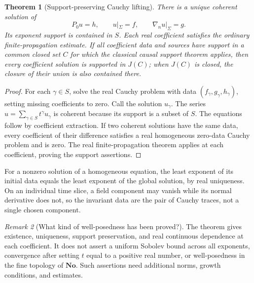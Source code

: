\documentclass[11pt,letterpaper]{article}
\newtheorem{theorem}{Theorem}[section]
\theoremstyle{definition}
\theoremstyle{remark}
\newtheorem{remark}[theorem]{Remark}
\newcommand{\No}{\mathbf{No}}
\begin{document}
\begin{theorem}[Support-preserving Cauchy lifting]\label{vtf:mink:thm:Cauchy}
There is a unique coherent solution of
\begin{equation}\label{vtf:mink:eq:Cauchy}
 P_0u=h,\qquad u|_\Sigma=f,\qquad
 \nabla_nu|_\Sigma=g.
\end{equation}
Its exponent support is contained in $S$. Each real coefficient satisfies the ordinary finite-propagation estimate. If all coefficient data and sources have support in a common closed set $C$ for which the classical causal support theorem applies, then every coefficient solution is supported in $J(C)$; when $J(C)$ is closed, the closure of their union is also contained there.
\end{theorem}
\begin{proof}
For each $\gamma\in S$, solve the real Cauchy problem with data $(f_\gamma,g_\gamma,h_\gamma)$, setting missing coefficients to zero. Call the solution $u_\gamma$. The series $u=\sum_{\gamma\in S}t^\gamma u_\gamma$ is coherent because its support is a subset of $S$. The equations follow by coefficient extraction. If two coherent solutions have the same data, every coefficient of their difference satisfies a real homogeneous zero-data Cauchy problem and is zero. The real finite-propagation theorem applies at each coefficient, proving the support assertions.
\end{proof}

For a nonzero solution of a homogeneous equation, the least exponent of its initial data equals the least exponent of the global solution, by real uniqueness. On an individual time slice, a field component may vanish while its normal derivative does not, so the invariant data are the pair of Cauchy traces, not a single chosen component.

\begin{remark}[What kind of well-posedness has been proved?]
The theorem gives existence, uniqueness, support preservation, and real continuous dependence at each coefficient. It does not assert a uniform Sobolev bound across all exponents, convergence after setting $t$ equal to a positive real number, or well-posedness in the fine topology of $\No$. Such assertions need additional norms, growth conditions, and estimates.
\end{remark}
\end{document}
